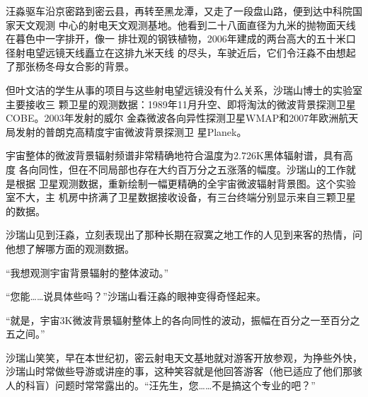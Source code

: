 \documentclass[UTF8]{ctexart}
\newcommand{\ParMargin}[2]{
\begin{list}{}{
\setlength{\topsep}{0ex}
\setlength{\parsep}{0ex}
\setlength{\leftmargin}{#1em}
\setlength{\itemindent}{0em}
\setlength{\itemsep}{0ex}
}
#2
\end{list}
}
\begin{document}
汪淼驱车沿京密路到密云县，再转至黑龙潭，又走了一段盘山路，便到达中科院国家天文观测
中心的射电天文观测基地。他看到二十八面直径为九米的抛物面天线在暮色中一字排开，像一
排壮观的钢铁植物，2006年建成的两台高大的五十米口径射电望远镜天线矗立在这排九米天线
的尽头，车驶近后，它们令汪淼不由想起了那张杨冬母女合影的背景。\par
\ParMargin{-2}{
    \item 但叶文洁的学生从事的项目与这些射电望远镜没有什么关系，沙瑞山博士的实验室主要接收三
        颗卫星的观测数据：1989年11月升空、即将淘汰的微波背景探测卫星COBE。2003年发射的威尔
        金森微波各向异性探测卫星WMAP和2007年欧洲航天局发射的普朗克高精度宇宙微波背景探测卫
        星Planek。
}
\ParMargin{0}{
    \item 宇宙整体的微波背景辐射频谱非常精确地符合温度为2.726K黑体辐射谱，具有高度
        各向同性，但在不同局部也存在大约百万分之五涨落的幅度。沙瑞山的工作就是根据
        卫星观测数据，重新绘制一幅更精确的全宇宙微波辐射背景图。这个实验室不大，主
        机房中挤满了卫星数据接收设备，有三台终端分别显示来自三颗卫星的数据。\par
}\par
\ParMargin{2}{
    \item 沙瑞山见到汪淼，立刻表现出了那种长期在寂寞之地工作的人见到来客的热情，问
        他想了解哪方面的观测数据。\par
}\par
\ParMargin{4}{
    \item “我想观测宇宙背景辐射的整体波动。”
    \item “您能……说具体些吗？”沙瑞山看汪淼的眼神变得奇怪起来。
    \item “就是，宇宙3K微波背景辐射整体上的各向同性的波动，振幅在百分之一至百分之
        五之间。”
}\par
\ParMargin{6}{
    \item 沙瑞山笑笑，早在本世纪初，密云射电天文基地就对游客开放参观，为挣些外快，
        沙瑞山时常做些导游或讲座的事，这种笑容就是他回答游客（他已适应了他们那骇
        人的科盲）问题时常常露出的。“汪先生，您……不是搞这个专业的吧？”
}\par
\end{document}
